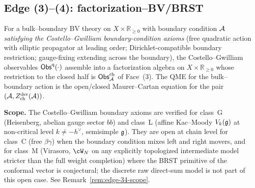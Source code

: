 \subsection{Edge (3)--(4): factorization--BV/BRST}\label{subsec:edge-34}

\begin{theorem}\label{thm:edge-34}%
%
For a bulk--boundary BV theory on $X\times\mathbb{R}_{\geq 0}$ with
boundary condition $\mathcal{A}$ \emph{satisfying the Costello--Gwilliam
boundary-condition axioms} (free quadratic action with elliptic
propagator at leading order; Dirichlet-compatible boundary
restriction; gauge-fixing extending across the boundary), the
Costello--Gwilliam observables $\mathsf{Obs}^{\mathrm{q}}(\cdot)$ assemble
into a factorization algebra on $X\times\mathbb{R}_{\geq 0}$ whose
restriction to the closed half is $\mathsf{Obs}^{\mathrm{ch}}_{\mathcal{A}}$ of
Face~(3). The QME for the bulk--boundary action is the open/closed
Maurer--Cartan equation for the pair $(\mathcal{A},Z^{\mathrm{der}}_{\mathrm{ch}}(\mathcal{A}))$.

\smallskip
\textbf{Scope.} The Costello--Gwilliam boundary axioms are verified for
class~G (Heisenberg, abelian gauge sector $bb$) and class~L (affine
Kac--Moody $V_k(\mathfrak{g})$ at non-critical level $k\neq -h^\vee$, semisimple
$\mathfrak{g}$). They are open at chain level for class~C (free $\beta\gamma$)
when the boundary condition mixes left and right movers, and for
class~M (Virasoro, $\cW_N$ on any explicitly topologized
intermediate model stricter than the full weight completion) where
the BRST primitive of the conformal vector is conjectural; the
discrete raw direct-sum model is not part of this open case.
See Remark~\ref{rem:edge-34-scope}.
\end{theorem}

